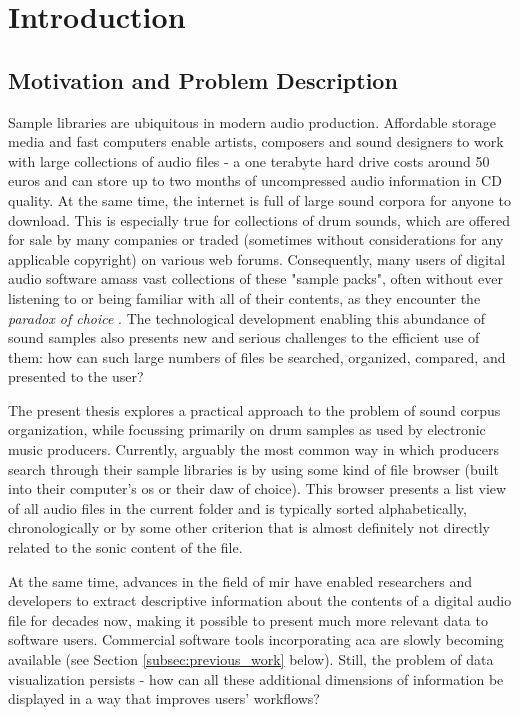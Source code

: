 
\section{Introduction}
\label{sec:introduction}

\subsection{Motivation and Problem Description}
\label{subsec:motivation}
Sample libraries are ubiquitous in modern audio production. Affordable storage
media and fast computers enable artists, composers and sound designers to work
with large collections of audio files - a one terabyte hard drive costs around
50 euros and can store up to two months of uncompressed audio information in CD
quality. At the same time, the internet is full of large sound corpora for
anyone to download. This is especially true for collections of drum sounds,
which are offered for sale by many companies or traded (sometimes without
considerations for any applicable copyright) on various web forums.
Consequently, many users of digital audio software amass vast collections of
these "sample packs", often without ever listening to or being familiar with
all of their contents, as they encounter the \textit{paradox of choice}
\citep{schwartz2004}. The technological development enabling this abundance of
sound samples also presents new and serious challenges to the efficient use of
them: how can such large numbers of files be searched, organized, compared, and
presented to the user?

\bigskip

The present thesis explores a practical approach to the problem of sound corpus
organization, while focussing primarily on drum samples as used by electronic
music producers.
Currently, arguably the most common way in which producers
search through their sample libraries is by using some kind of file browser
(built into their computer's \gls{os} or their \gls{daw} of choice). This
browser presents a list view of all audio files in the current folder and is
typically sorted alphabetically, chronologically or by some other criterion that
is almost definitely not directly related to the sonic content of the file.

\smallskip

At the same time, advances in the field of \gls{mir} have enabled researchers
and developers to extract descriptive information about the contents
of a digital audio file for decades now, making it possible to present much
more relevant data to software users. Commercial software tools incorporating
\gls{aca} are slowly becoming available (see Section \ref{subsec:previous_work}
below). Still, the problem of data visualization persists - how can all these
additional dimensions of information be displayed in a way that improves users'
workflows?

